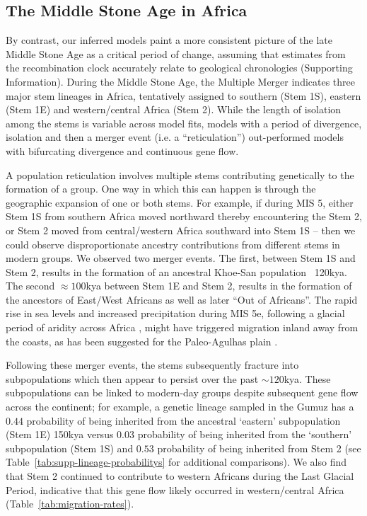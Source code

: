 \documentclass[]{article}
\begin{document}
\subsection*{The Middle Stone Age in Africa}

By contrast, our inferred models paint a more consistent picture of the late
Middle Stone Age as a critical period of change, assuming that estimates from
the recombination clock accurately relate to geological chronologies
(Supporting Information).
During the Middle Stone Age, the Multiple Merger indicates three
major stem lineages in Africa, tentatively assigned to southern (Stem 1S),
eastern (Stem 1E) and western/central Africa (Stem 2). While the length of
isolation among the stems is variable across model fits, models with a period of 
divergence, isolation and then a merger event (i.e. a ``reticulation'')
out-performed models with bifurcating divergence and continuous gene flow. 

A population reticulation involves multiple stems contributing genetically to
the formation of a group. One way in which this can happen is through the
geographic expansion of one or both stems. For example, if during MIS 5, either
Stem 1S from southern Africa moved northward thereby encountering the Stem 2,
or Stem 2 moved from central/western Africa southward into Stem 1S -- then we
could observe disproportionate ancestry contributions from different stems in
modern groups. We observed two merger events. The first, between Stem 1S and
Stem 2, results in the formation of an ancestral Khoe-San population ~120kya.
The second $\approx100$kya between Stem 1E and Stem 2, results in the formation of the
ancestors of East/West Africans as well as later ``Out of Africans''. The rapid
rise in sea levels and increased precipitation during MIS 5e, following a
glacial period of aridity across Africa \citep{Blome2012-lw}, might have
triggered migration inland away from the coasts, as has been suggested for the
Paleo-Agulhas plain \citep{Marean2014-pg}. 

Following these merger events, the stems subsequently fracture into
subpopulations which then appear to persist over the past $\sim120$kya. These
subpopulations can be linked to modern-day groups despite subsequent gene flow
across the continent; for example, a genetic lineage sampled in the Gumuz has a
$0.44$ probability of being inherited from the ancestral ‘eastern’ subpopulation
(Stem 1E) 150kya versus $0.03$ probability of being inherited from the ‘southern’
subpopulation (Stem 1S) and $0.53$ probability of being inherited from Stem 2
(see Table~\ref{tab:supp-lineage-probabilitys} for additional comparisons). We also
find that Stem 2 continued to contribute to western Africans during the Last
Glacial Period, indicative that this gene flow likely occurred in
western/central Africa (Table~\ref{tab:migration-rates}). 
\end{document}

